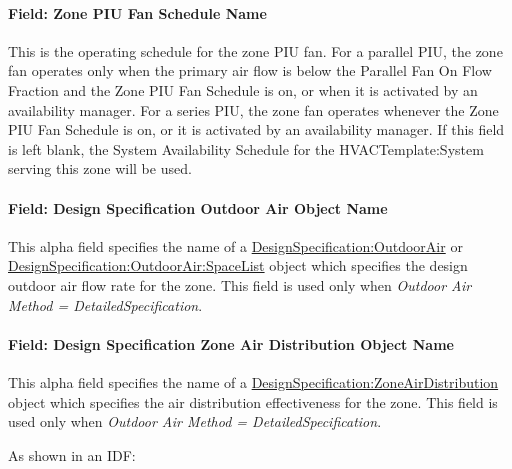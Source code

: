 \paragraph{Field: Zone PIU Fan Schedule Name}\label{field-zone-piu-fan-schedule-name}

This is the operating schedule for the zone PIU fan. For a parallel PIU, the zone fan operates only when the primary air flow is below the Parallel Fan On Flow Fraction and the Zone PIU Fan Schedule is on, or when it is activated by an availability manager. For a series PIU, the zone fan operates whenever the Zone PIU Fan Schedule is on, or it is activated by an availability manager. If this field is left blank, the System Availability Schedule for the HVACTemplate:System serving this zone will be used.

\paragraph{Field: Design Specification Outdoor Air Object Name}\label{field-design-specification-outdoor-air-object-name-8}

This alpha field specifies the name of a \hyperref[designspecificationoutdoorair]{DesignSpecification:OutdoorAir} or \hyperref[designspecificationoutdoorairspacelist]{DesignSpecification:OutdoorAir:SpaceList} object which specifies the design outdoor air flow rate for the zone. This field is used only when \emph{Outdoor Air Method = DetailedSpecification}.

\paragraph{Field: Design Specification Zone Air Distribution Object Name}\label{field-design-specification-zone-air-distribution-object-name-8}

This alpha field specifies the name of a \hyperref[designspecificationzoneairdistribution]{DesignSpecification:ZoneAirDistribution} object which specifies the air distribution effectiveness for the zone. This field is used only when \emph{Outdoor Air Method = DetailedSpecification}.

As shown in an IDF:

